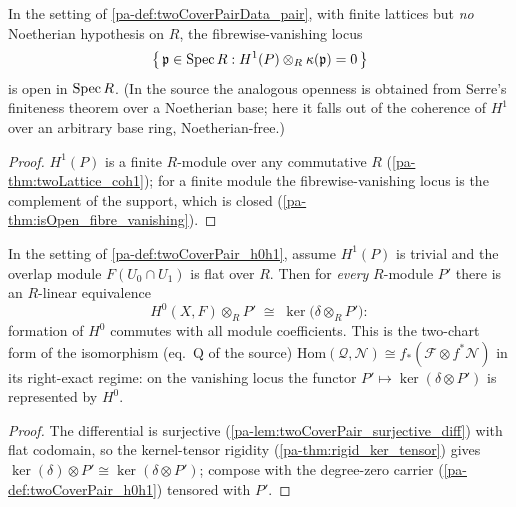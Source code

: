 \begin{theorem}
  \label{pa-thm:twoCoverPair_isOpen_vanishing}
  \leanok


  In the setting of \ref{pa-def:twoCoverPairData_pair}, with finite lattices but \emph{no}
  Noetherian hypothesis on \(R\), the fibrewise-vanishing locus
  \[
    \bigl\{\, \mathfrak p \in \operatorname{Spec} R :
      H^1(P) \otimes_R \kappa(\mathfrak p) = 0 \,\bigr\}
  \]
  is open in \(\operatorname{Spec} R\). (In the source the analogous openness is obtained from
  Serre's finiteness theorem over a Noetherian base; here it falls out of the coherence
  of \(H^1\) over an arbitrary base ring, Noetherian-free.)
\end{theorem}
\begin{proof}
  \leanok
  \(H^1(P)\) is a finite \(R\)-module over any commutative \(R\)
  (\ref{pa-thm:twoLattice_coh1}); for a finite module the fibrewise-vanishing locus is the
  complement of the support, which is closed (\ref{pa-thm:isOpen_fibre_vanishing}).
\end{proof}

\begin{definition}
  \label{pa-def:twoCoverPair_h0TensorEquiv}
  \leanok

  In the setting of \ref{pa-def:twoCoverPair_h0h1}, assume \(H^1(P)\) is trivial and the
  overlap module \(F(U_0 \cap U_1)\) is flat over \(R\). Then for \emph{every}
  \(R\)-module \(P'\) there is an \(R\)-linear equivalence
  \[
    H^0(X, F) \otimes_R P' \;\cong\;
      \ker\bigl(\delta \otimes_R P'\bigr) :
  \]
  formation of \(H^0\) commutes with all module coefficients. This is the two-chart
  form of the isomorphism (eq.\ Q of the source)
  \(\mathrm{Hom}(\mathcal Q, \mathcal N) \cong f_*(\mathcal F \otimes f^*\mathcal N)\)
  in its right-exact regime: on the vanishing locus the functor
  \(P' \mapsto \ker(\delta \otimes P')\) is represented by \(H^0\).
\end{definition}
\begin{proof}
  \leanok
  The differential is surjective (\ref{pa-lem:twoCoverPair_surjective_diff}) with flat
  codomain, so the kernel-tensor rigidity (\ref{pa-thm:rigid_ker_tensor}) gives
  \(\ker(\delta) \otimes P' \cong \ker(\delta \otimes P')\); compose with the
  degree-zero carrier (\ref{pa-def:twoCoverPair_h0h1}) tensored with \(P'\).
\end{proof}

